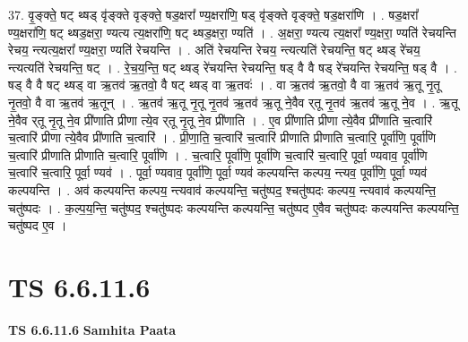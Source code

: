 \documentclass[17pt]{extarticle}
\begin{document}
37. वृ॒ङ्क्ते॒ षट् थ्षड् वृ॑ङ्क्ते वृङ्क्ते॒ षड॒क्षरा᳚ ण्य॒क्षरा॑णि॒ षड् वृ॑ङ्क्ते वृङ्क्ते॒ 
षड॒क्षरा॑णि । . षड॒क्षरा᳚ ण्य॒क्षरा॑णि॒ षट् थ्षड॒क्षरा॒ ण्यत्य त्य॒क्षरा॑णि॒ षट् थ्षड॒क्षरा॒ ण्यति॑ । . अ॒क्षरा॒ ण्यत्य त्य॒क्षरा᳚ ण्य॒क्षरा॒ ण्यति॑ रेचयन्ति रेचय॒ न्त्यत्य॒क्षरा᳚ ण्य॒क्षरा॒ ण्यति॑ रेचयन्ति । . अति॑ रेचयन्ति रेचय॒ न्त्यत्यति॑ रेचयन्ति॒ षट् थ्षड् रे॑चय॒ न्त्यत्यति॑ रेचयन्ति॒ षट् । . रे॒च॒य॒न्ति॒ षट् थ्षड् रे॑चयन्ति रेचयन्ति॒ षड् वै वै षड् रे॑चयन्ति रेचयन्ति॒ षड् वै । . षड् वै वै षट् थ्षड् वा ऋ॒तव॑ ऋ॒तवो॒ वै षट् थ्षड् वा ऋ॒तवः॑ । . वा ऋ॒तव॑ ऋ॒तवो॒ वै वा ऋ॒तव॑ ऋ॒तू नृ॒तू नृ॒तवो॒ वै वा ऋ॒तव॑ ऋ॒तून् । . ऋ॒तव॑ ऋ॒तू नृ॒तू नृ॒तव॑ ऋ॒तव॑ ऋ॒तू ने॒वैव र्‌तू नृ॒तव॑ ऋ॒तव॑ ऋ॒तू ने॒व । . ऋ॒तू ने॒वैव र्‌तू नृ॒तू ने॒व प्री॑णाति प्रीणा त्ये॒व र्‌तू नृ॒तू ने॒व प्री॑णाति । . ए॒व प्री॑णाति प्रीणा त्ये॒वैव प्री॑णाति च॒त्वारि॑ च॒त्वारि॑ प्रीणा त्ये॒वैव प्री॑णाति च॒त्वारि॑ । . प्री॒णा॒ति॒ च॒त्वारि॑ च॒त्वारि॑ प्रीणाति प्रीणाति च॒त्वारि॒ पूर्वा॑णि॒ पूर्वा॑णि च॒त्वारि॑ प्रीणाति प्रीणाति च॒त्वारि॒ पूर्वा॑णि । . च॒त्वारि॒ पूर्वा॑णि॒ पूर्वा॑णि च॒त्वारि॑ च॒त्वारि॒ पूर्वा॒ ण्यवाव॒ पूर्वा॑णि च॒त्वारि॑ च॒त्वारि॒ पूर्वा॒ ण्यव॑ । . पूर्वा॒ ण्यवाव॒ पूर्वा॑णि॒ पूर्वा॒ ण्यव॑ कल्पयन्ति कल्पय॒ न्त्यव॒ पूर्वा॑णि॒ पूर्वा॒ ण्यव॑ कल्पयन्ति । . अव॑ कल्पयन्ति कल्पय॒ न्त्यवाव॑ कल्पयन्ति॒ चतु॑ष्पद॒ श्चतु॑ष्पदः कल्पय॒ न्त्यवाव॑ कल्पयन्ति॒ चतु॑ष्पदः । . क॒ल्प॒य॒न्ति॒ चतु॑ष्पद॒ श्चतु॑ष्पदः कल्पयन्ति कल्पयन्ति॒ चतु॑ष्पद ए॒वैव चतु॑ष्पदः कल्पयन्ति कल्पयन्ति॒ चतु॑ष्पद ए॒व । \newline
\pagebreak
{}

\section{ TS 6.6.11.6 }

\textbf{TS 6.6.11.6 } \newline
\textbf{Samhita Paata} \newline
\end{document}
